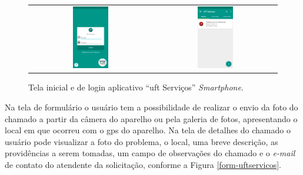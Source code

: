 \begin{figure}[H]
\centering
    \begin{tabular}{cc}
     \includegraphics[width=0.3\textwidth]{figuras/applogin_uftservicos.png}  &  \includegraphics[width=0.3\textwidth]{figuras/appstart-chamadoaberto-uftservicos.png} 
    \end{tabular}
    \caption{Tela inicial e de login aplicativo ``\acrshort{uft} Serviços'' \textit{Smartphone}.}
    \label{start-uftservicos}
\end{figure}

Na tela de formulário o usuário tem a possibilidade de realizar o envio da foto do chamado a partir da câmera do aparelho ou pela galeria de fotos, apresentando o local em que ocorreu com o \acrshort{gps} do aparelho. Na tela de detalhes do chamado o usuário pode visualizar a foto do problema, o local, uma breve descrição, as providências a serem tomadas, um campo de observações do chamado e o \textit{e-mail} de contato do atendente da solicitação, conforme a Figura \ref{form-uftservicos}.

